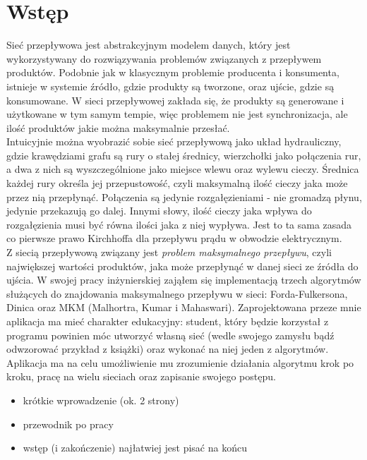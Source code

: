 \chapter{Wstęp}
Sieć przepływowa jest abstrakcyjnym modelem danych, który jest wykorzystywany do rozwiązywania problemów związanych z przepływem produktów. Podobnie jak w klasycznym problemie producenta i konsumenta, istnieje w systemie źródło, gdzie produkty są tworzone, oraz ujście, gdzie są konsumowane. W sieci przepływowej zakłada się, że produkty są generowane i użytkowane w tym samym tempie, więc problemem nie jest synchronizacja, ale ilość produktów jakie można maksymalnie przesłać.\\\indent
Intuicyjnie można wyobrazić sobie sieć przepływową jako układ hydrauliczny, gdzie krawędziami grafu są rury o stałej średnicy, wierzchołki jako połączenia rur, a dwa z nich są wyszczególnione jako miejsce wlewu oraz wylewu cieczy. Średnica każdej rury określa jej przepustowość, czyli maksymalną ilość cieczy jaka może przez nią przepłynąć. Połączenia są jedynie rozgałęzieniami - nie gromadzą płynu, jedynie przekazują go dalej. Innymi słowy, ilość cieczy jaka wpływa do rozgałęzienia musi być równa ilości jaka z niej wypływa. Jest to ta sama zasada co pierwsze prawo Kirchhoffa dla przepływu prądu w obwodzie elektrycznym.\\\indent
Z siecią przepływową związany jest \textit{problem maksymalnego przepływu}, czyli największej wartości produktów, jaka może przepłynąć w danej sieci ze źródła do ujścia. W swojej pracy inżynierskiej zająłem się implementacją trzech algorytmów służących do znajdowania maksymalnego przepływu w sieci: Forda-Fulkersona, Dinica oraz MKM (Malhortra, Kumar i Mahaswari). Zaprojektowana przeze mnie aplikacja ma mieć charakter edukacyjny: student, który będzie korzystał z programu powinien móc utworzyć własną sieć (wedle swojego zamysłu bądź odwzorować przykład z książki) oraz wykonać na niej jeden z algorytmów. Aplikacja ma na celu umożliwienie mu zrozumienie działania algorytmu krok po kroku, pracę na wielu sieciach oraz zapisanie swojego postępu.

\begin{itemize}
	\item krótkie wprowadzenie (ok. 2 strony)
	\item przewodnik po pracy
	\item wstęp (i zakończenie) najłatwiej jest pisać na końcu
\end{itemize}